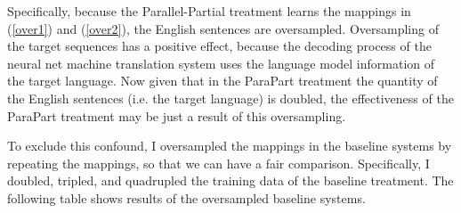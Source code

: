 \documentclass[final]{ua-thesis}
\numberwithin{equation}{section}
\begin{document}
Specifically, because the Parallel-Partial treatment learns the mappings in (\ref{over1}) and (\ref{over2}), the English sentences are oversampled. Oversampling of the target sequences has a positive effect, because the decoding process of the neural net machine translation system uses the language model information of the target language. Now given that in the ParaPart treatment the quantity of the English sentences (i.e. the target language) is doubled, the effectiveness of the ParaPart treatment may be just a result of this oversampling.   

To exclude this confound, I oversampled the mappings in the baseline systems by repeating the mappings, so that we can have a fair comparison. Specifically, I doubled, tripled, and quadrupled the training data of the baseline treatment. The following table shows results of the oversampled baseline systems. 
\end{document}
